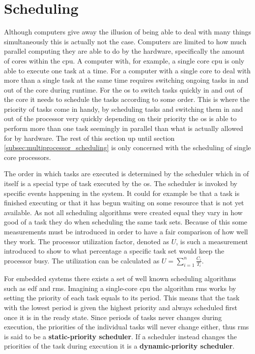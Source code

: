 \documentclass{kththesis}
\begin{document}
\section{Scheduling} \label{sec:scheduling}

Although computers give away the illusion of being able to deal with many things simultaneously this
is actually not the case. Computers are limited to how much parallel computing they are able to do
by the hardware, specifically the amount of cores within the \acrshort{cpu}. A computer with, for
example, a single core \acrshort{cpu} is only able to execute one task at a time. For a computer
with a single core to deal with more than a single task at the same time requires switching ongoing
tasks in and out of the core during runtime. For the \acrshort{os} to switch tasks quickly in and
out of the core it needs to schedule the tasks according to some order. This is where the priority
of tasks come in handy, by scheduling tasks and switching them in and out of the processor very
quickly depending on their priority the \acrshort{os} is able to perform more than one task seemingly in
parallel than what is actually allowed for by hardware. The rest of this section up until section
\ref{subsec:multiprocessor_scheduling} is only concerned with the scheduling of single core
processors.

The order in which tasks are executed is determined by the scheduler which in of itself is a special
type of task executed by the \acrshort{os}. The scheduler is invoked by specific events happening in
the system. It could for example be that a task is finished executing or that it has begun waiting
on some resource that is not yet available. As not all scheduling algorithms were created equal they
vary in how good of a task they do when scheduling the same task sets. Because of this some
measurements must be introduced in order to have a fair comparison of how well they work. The
processor utilization factor, denoted as $ U $, is such a measurement introduced to show to what
percentage a specific task set would keep the processor busy. The utilization can be calculated as
$ U = \sum_{i=1}^n \frac{C_i}{T_i} $.

For embedded systems there exists a set of well known scheduling algorithms such as \acrshort{edf}
and \acrshort{rms}. Imagining a single-core \acrshort{cpu} the algorithm \acrshort{rms} works by
setting the priority of each task equals to its period. This means that the task with the lowest
period is given the highest priority and always scheduled first once it is in the ready state. Since
periods of tasks never changes during execution, the priorities of the individual tasks will never
change either, thus \acrshort{rms} is said to be a \textbf{static-priority scheduler}. If a
scheduler instead changes the priorities of the task during execution it is a
\textbf{dynamic-priority scheduler}. 
\end{document}
